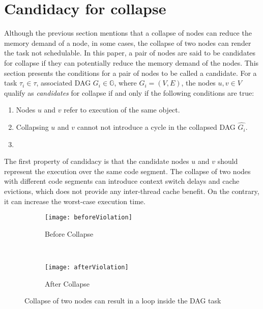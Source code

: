 \section{Candidacy for collapse}
\label{sec:candidacy}
Although the previous section mentions that a collapse of nodes can reduce the memory demand of a node,  in some cases, the collapse of two nodes can render the task not schedulable. In this paper, a pair of nodes are said to be candidates for collapse if they can potentially reduce the memory demand of the nodes. This section presents the conditions for a pair of nodes to be called a candidate. For a task ${\tau_i \in \tau}$, associated DAG ${G_i \in \mathbb{G}}$,
where ${G_i = (V, E)}$, the nodes ${u,v \in V}$ qualify as
\emph{candidates} for collapse if and only if the following conditions
are true: 
\begin{enumerate}
  \item Nodes ${u}$ and ${v}$ refer to execution of the same object.
  \item Collapsing ${u}$ and ${v}$ cannot not introduce a cycle in the collapsed DAG $\hat{G_i}$.
  \item {}
\end{enumerate}

The first property of candidacy is that the candidate nodes $u$ and $v$ should represent the execution over the same code segment. The collapse of two nodes with different code segments can introduce context switch delays and cache evictions, which does not provide any inter-thread cache benefit. On the contrary, it can increase the worst-case execution time. 



\begin{figure}
  \centering
  \begin{subfigure}[b]{0.48\textwidth}{
      \texttt{[image: beforeViolation]}
      \caption{Before Collapse}
      \label{fig:beforeViolation}
    }
  \end{subfigure}~
  \begin{subfigure}[b]{0.33\textwidth}{
      \texttt{[image: afterViolation]}
      \caption{After Collapse}
      \label{fig:afterViolation}
    }
  \end{subfigure}
  \caption{Collapse of two nodes can result in a loop inside the DAG task}
  \label{fig:dag-violation}
\end{figure}


